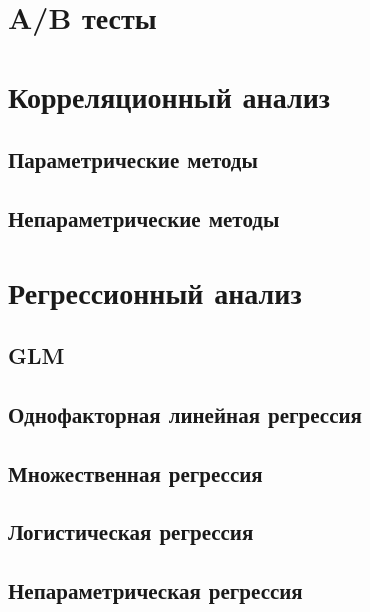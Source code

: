\documentclass[]{scrartcl}
\begin{document}
\section{A/B тесты}

\section{Корреляционный анализ}

\subsection{Параметрические методы}

\subsection{Непараметрические методы}

\section{Регрессионный анализ}

\subsection{GLM}

\subsection{Однофакторная линейная регрессия}

\subsection{Множественная регрессия}

\subsection{Логистическая регрессия}

\subsection{Непараметрическая регрессия}
\end{document}
